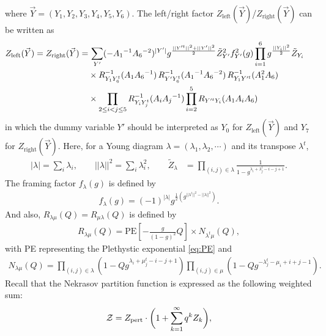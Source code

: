 \documentclass[letterpaper, 11pt]{article}
\def\CZ{{\cal Z}}
\begin{document}
{\begin{align}
\end{align}
where $\vec{Y}=(Y_1, Y_2, Y_3, Y_4, Y_5, Y_6)$. The left/right factor 
$Z_{\text{left}}(\vec{Y})$/$Z_{\text{right}}(\vec{Y})$ can be written as 
\begin{align}
\begin{split}
Z_{\text{left}}(\vec{Y}) = Z_{\text{right}}(\vec{Y})=& \,
\sum_{Y'} ( - A_1{}^{-1} A_6{}^{-2})^{|Y'|} 
g^{\frac{||Y'^t||^2+||Y'||^2}{2}} \tilde{Z}_{Y'}^2 f_{Y'}^2(g)
\prod_{i=1}^6 g^{\frac{||Y_i||^2}{2}} \tilde{Z}_{Y_i} 
\cr 
& 
\times 
R_{Y_1 Y_6^t}^{-1} (A_1 A_6{}^{-1})\,R_{Y' Y_6^t}^{-1} (A_1{}^{-1} A_6{}^{-2})\,R_{Y_1Y'^t }^{-1} (A_1^2A_6) \cr 
& 
\times  
 \prod_{2 \le i <  j \le 5} R_{Y_i Y_j^t}^{-1} (A_i A_j{}^{-1})
 \prod_{i=2}^5 R_{Y'^t Y_i} (A_1 A_i  A_6) 
\end{split}
\end{align}
in which the dummy variable $Y'$ should be interpreted as $Y_0$ for $Z_{\text{left}}(\vec{Y})$ and  $Y_7$ for $Z_{\text{right}}(\vec{Y})$. %
Here, for a Young diagram $\lambda = (\lambda_1, \lambda_2, \cdots)$ and its transpose $\lambda^t$,  
\begin{align}
  |\lambda|=\sum_{i}\lambda_i, \qquad ||\lambda||^2 =\sum_{i}\lambda_i^2, \qquad  \tilde{Z}_{\lambda} 
&= \prod_{(i,j) \in \lambda} \frac{1}{1 - g^{\lambda_i + \lambda^t_j - i - j +1} }. 	
\end{align}
The framing factor $f_{\lambda}(g)$ is defined by
\begin{align}
f_\lambda(g) = (-1)^{|\lambda|}g^{\frac{1}{2}(g^{||\lambda^t||^2 - ||\lambda||^2})}.
\end{align}
And also, $R_{\lambda \mu } (Q)=R_{\mu \lambda} (Q)$ is defined by
\begin{align}
R_{\lambda \mu } (Q)%
=\text{PE} \left[ - \frac{g}{(1-g)^2} Q \right]
\times N_{\lambda^t \mu} (Q),
\end{align}
with PE representing the Plethystic exponential \eqref{eq:PE}
 and 
\begin{align}
N_{\lambda \mu} (Q) 
= \prod_{(i,j) \in \lambda} \left( 1 - Q g^{\lambda_i + \mu_j^t -i-j+1} \right)
\prod_{(i,j) \in \mu} \left( 1 - Q g^{-\lambda^t_j - \mu_i + i + j - 1} \right). 
\end{align}
Recall that the Nekrasov partition function is expressed as the following weighted sum: 
\begin{align}
\CZ = Z_{\text{pert}} \cdot \bigg(1 + \sum_{k=1}^{\infty}q^kZ_k\bigg) ,

\end{align}}
\end{document}
